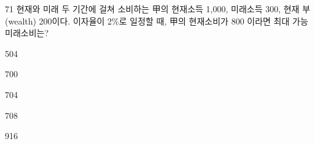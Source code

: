 \begin{question}{71}
현재와 미래 두 기간에 걸쳐 소비하는 甲의 현재소득 1,000, 미래소득 300, 현재 부 (wealth) 200이다. 이자율이 2\%로 일정할 때, 甲의 현재소비가 800 이라면 최대 가능 미래소비는?
\begin{choices}
  \item 504
  \item 700
  \item 704
  \item 708
  \item 916
\end{choices}
\end{question}
